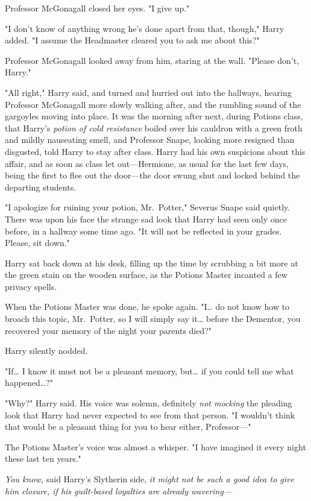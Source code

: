 Professor McGonagall closed her eyes. "I give up."

"I don't know of anything wrong he's done apart from that, though," Harry added. "I assume the Headmaster cleared you to ask me about this?"

Professor McGonagall looked away from him, staring at the wall. "Please don't, Harry."

"All right," Harry said, and turned and hurried out into the hallways, hearing Professor McGonagall more slowly walking after, and the rumbling sound of the gargoyles moving into place.
\sbreak
It was the morning after next, during Potions class, that Harry's \emph{potion of cold resistance} boiled over his cauldron with a green froth and mildly nauseating smell, and Professor Snape, looking more resigned than disgusted, told Harry to stay after class. Harry had his own suspicions about this affair, and as soon as class let out---Hermione, as usual for the last few days, being the first to flee out the door---the door swung shut and locked behind the departing students.

"I apologize for ruining your potion, Mr.~Potter," Severus Snape said quietly. There was upon his face the strange sad look that Harry had seen only once before, in a hallway some time ago. "It will not be reflected in your grades. Please, sit down."

Harry sat back down at his desk, filling up the time by scrubbing a bit more at the green stain on the wooden surface, as the Potions Master incanted a few privacy spells.

When the Potions Master was done, he spoke again. "I{\ldots} do not know how to broach this topic, Mr.~Potter, so I will simply say it{\ldots} before the Dementor, you recovered your memory of the night your parents died?"

Harry silently nodded.

"If{\ldots} I know it must not be a pleasant memory, but{\ldots} if you could tell me what happened{\ldots}?"

"Why?" Harry said. His voice was solemn, definitely \emph{not mocking} the pleading look that Harry had never expected to see from that person. "I wouldn't think that would be a pleasant thing for you to hear either, Professor---"

The Potions Master's voice was almost a whisper. "I have imagined it every night these last ten years."

\emph{You know,} said Harry's Slytherin side, \emph{it might not be such a good idea to give him closure, if his guilt-based loyalties are already wavering---}

